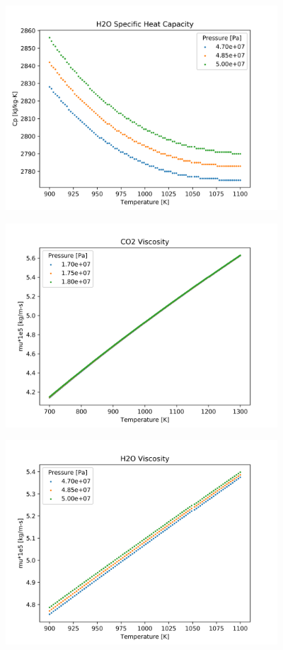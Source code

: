 \begin{figure}[h]
    \centering
    \includegraphics[width=4in]{../images/property_plots/H2O_Specific_Heat_Capacity.png}
\end{figure}

\begin{figure}[h]
    \centering
    \includegraphics[width=4in]{../images/property_plots/CO2_Viscosity.png}
\end{figure}

\begin{figure}[h]
    \centering
    \includegraphics[width=4in]{../images/property_plots/H2O_Viscosity.png}
\end{figure}

